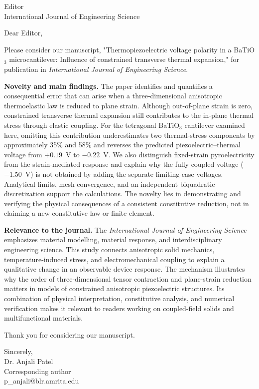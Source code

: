 \documentclass[11pt]{letter}
\begin{document}
\begin{letter}{Editor\\International Journal of Engineering Science}
\opening{Dear Editor,}

Please consider our manuscript, "Thermopiezoelectric voltage polarity in a BaTiO$_3$ microcantilever: Influence of constrained transverse thermal expansion," for publication in \emph{International Journal of Engineering Science}.

\textbf{Novelty and main findings.} The paper identifies and quantifies a consequential error that can arise when a three-dimensional anisotropic thermoelastic law is reduced to plane strain. Although out-of-plane strain is zero, constrained transverse thermal expansion still contributes to the in-plane thermal stress through elastic coupling. For the tetragonal BaTiO$_3$ cantilever examined here, omitting this contribution underestimates two thermal-stress components by approximately 35\% and 58\% and reverses the predicted piezoelectric--thermal voltage from $+0.19$~V to $-0.22$~V. We also distinguish fixed-strain pyroelectricity from the strain-mediated response and explain why the fully coupled voltage ($-1.50$~V) is not obtained by adding the separate limiting-case voltages. Analytical limits, mesh convergence, and an independent biquadratic discretization support the calculations. The novelty lies in demonstrating and verifying the physical consequences of a consistent constitutive reduction, not in claiming a new constitutive law or finite element.

\textbf{Relevance to the journal.} The \emph{International Journal of Engineering Science} emphasizes material modelling, material response, and interdisciplinary engineering science. This study connects anisotropic solid mechanics, temperature-induced stress, and electromechanical coupling to explain a qualitative change in an observable device response. The mechanism illustrates why the order of three-dimensional tensor contraction and plane-strain reduction matters in models of constrained anisotropic piezoelectric structures. Its combination of physical interpretation, constitutive analysis, and numerical verification makes it relevant to readers working on coupled-field solids and multifunctional materials.

Thank you for considering our manuscript.

\closing{Sincerely,\\Dr. Anjali Patel\\Corresponding author\\p\_anjali@blr.amrita.edu}
\end{letter}
\end{document}
